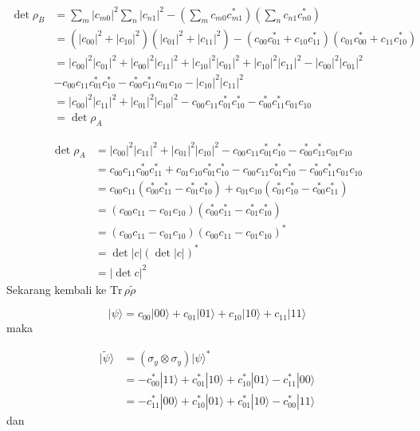 \begin{equation}
	\begin{aligned}
		\det \rho_B
		&= \sum_m |c_{m0}|^2 \sum_n |c_{n1}|^2
		- \left( \sum_m c_{m0} c^{*}_{m1} \right)
		\left( \sum_n c_{n1} c^{*}_{n0} \right)\\
		&= (|c_{00}|^2 + |c_{10}|^2)(|c_{01}|^2 + |c_{11}|^2)
		- (c_{00} c^{*}_{01} + c_{10} c^{*}_{11})
		(c_{01} c^{*}_{00} + c_{11} c^{*}_{10})\\
		&= |c_{00}|^2 |c_{01}|^2
		+ |c_{00}|^2 |c_{11}|^2
		+ |c_{10}|^2 |c_{01}|^2
		+ |c_{10}|^2 |c_{11}|^2- |c_{00}|^2 |c_{01}|^2\\
		&- c_{00} c_{11} c^{*}_{01} c^{*}_{10}
		- c^{*}_{00} c^{*}_{11} c_{01} c_{10}- |c_{10}|^2 |c_{11}|^2\\
		&= |c_{00}|^2 |c_{11}|^2
		+ |c_{01}|^2 |c_{10}|^2
		- c_{00} c_{11} c^{*}_{01} c^{*}_{10}
		- c^{*}_{00} c^{*}_{11} c_{01} c_{10}\\
		&= \det \rho_A
	\end{aligned}
\end{equation}

\begin{equation}
	\begin{aligned}
		\det \rho_A
		&= |c_{00}|^2 |c_{11}|^2
		+ |c_{01}|^2 |c_{10}|^2
		- c_{00} c_{11} c^{*}_{01} c^{*}_{10}
		- c^{*}_{00} c^{*}_{11} c_{01} c_{10}\\
		&=c_{00} c_{11} c^{*}_{00} c^{*}_{11}
		+ c_{01} c_{10} c^{*}_{01} c^{*}_{10}-c_{00} c_{11} c^{*}_{01} c^{*}_{10}-c^{*}_{00} c^{*}_{11}c_{01} c_{10} \\
		&= c_{00}c_{11}(c^{*}_{00} c^{*}_{11} - c^{*}_{01} c^{*}_{10})+c_{01}c_{10}(c^{*}_{01} c^{*}_{10} - c^{*}_{00} c^{*}_{11})\\
		&= (c_{00} c_{11} - c_{01} c_{10})
		(c^{*}_{00} c^{*}_{11} - c^{*}_{01} c^{*}_{10})\\
		&= (c_{00} c_{11} - c_{01} c_{10})
		(c_{00} c_{11} - c_{01} c_{10})^{*}\\
		&= \det |c| (\det |c|)^{*}\\
		&= |\det c|^2
	\end{aligned}
\end{equation}
Sekarang kembali ke $\mathrm{Tr}\,\rho \tilde{\rho}$

\begin{equation}
	|\psi\rangle
	= c_{00}|00\rangle + c_{01}|01\rangle
	+ c_{10}|10\rangle + c_{11}|11\rangle
\end{equation}
maka

\begin{equation}
	\begin{aligned}
		|\tilde{\psi}\rangle
		&= (\sigma_y \otimes \sigma_y)|\psi\rangle^{*}\\
		&= -c^{*}_{00}|11\rangle
		+ c^{*}_{01}|10\rangle
		+ c^{*}_{10}|01\rangle
		- c^{*}_{11}|00\rangle\\
		&= -c^{*}_{11}|00\rangle
		+ c^{*}_{10}|01\rangle
		+ c^{*}_{01}|10\rangle
		- c^{*}_{00}|11\rangle
	\end{aligned}
\end{equation}
dan

